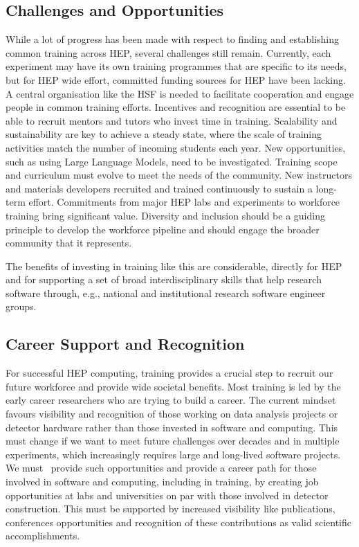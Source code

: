 \documentclass[10pt,a4paper]{article}
\begin{document}
\subsection{Challenges and
Opportunities}\label{challenges-and-opportunities}

While a lot of progress has been made with respect to finding and establishing
common training across HEP, several challenges still remain. Currently, each
experiment may have its own training programmes that are specific to its
needs, but for HEP wide effort, committed funding sources for HEP have been
lacking. A central organisation like the HSF is needed to facilitate cooperation
and engage people in common training efforts. Incentives and recognition are
essential to be able to recruit mentors and tutors who invest time in training.
Scalability and sustainability are key to achieve a steady state, where the
scale of training activities match the number of incoming students each year.
New opportunities, such as using Large Language Models, need to be investigated.
Training scope and curriculum must evolve to meet the needs of the community.
New instructors and materials developers recruited and trained continuously to
sustain a long-term effort. 
Commitments from major HEP labs and experiments to workforce training bring significant value. 
Diversity
and inclusion should be a guiding principle to develop the workforce pipeline
and should engage the broader community that it represents.

The benefits of investing in training like this are considerable, directly for
HEP and for supporting a set of broad interdisciplinary skills that help
research software through, e.g., national and institutional research software
engineer groups.

\subsection{Career Support and
Recognition}\label{career-support-and-recognition}

For successful HEP computing, training provides a crucial step to recruit our
future workforce and provide wide societal benefits. Most training is led by the
early career researchers who are trying to build a career. The current mindset
favours visibility and recognition of those working on data analysis projects or
detector hardware rather than those invested in software and computing. This
must change if we want to meet future challenges over decades and in multiple
experiments, which increasingly requires large and long-lived software projects.
We must~\cite{hsfcwp} provide such opportunities and provide a career path for those
involved in software and computing, including in training, by creating job
opportunities at labs and universities on par with those involved in detector
construction. This must be supported by increased visibility like publications,
conferences opportunities and recognition of these contributions as valid
scientific accomplishments.
\end{document}
